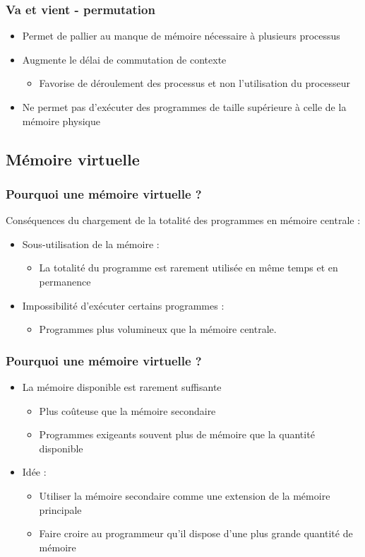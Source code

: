 \begin{frame}
\frametitle{Va et vient - permutation}
\begin{itemize}
\item Permet de pallier au manque de mémoire nécessaire à plusieurs processus
\item Augmente le délai de commutation de contexte
\begin{itemize}
\item Favorise de déroulement des processus et non l'utilisation du processeur
\end{itemize}
\item Ne permet pas d'exécuter des programmes de taille supérieure à celle de la mémoire physique
\end{itemize}
\end{frame}



\subsection{Mémoire virtuelle}
\begin{frame}
\frametitle{Pourquoi une mémoire virtuelle ?}
Conséquences du chargement de la totalité des programmes en mémoire centrale :
\begin{itemize}
\item Sous-utilisation de la mémoire :
\begin{itemize}
\item La totalité du programme est rarement utilisée en même temps et en permanence
\end{itemize}
\item Impossibilité d'exécuter certains programmes :
\begin{itemize}
\item Programmes plus volumineux que la mémoire centrale.
\end{itemize}
\end{itemize}
\end{frame}


\begin{frame}
\frametitle{Pourquoi une mémoire virtuelle ?}
\begin{itemize}
\item La mémoire disponible est rarement suffisante
\begin{itemize}
\item Plus coûteuse que la mémoire secondaire
\item Programmes exigeants souvent plus de mémoire que la quantité disponible
\end{itemize}
\item Idée :
\begin{itemize}
\item Utiliser la mémoire secondaire comme une extension de la mémoire principale
\item Faire croire au programmeur qu'il dispose d'une plus grande quantité de mémoire
\end{itemize}
\end{itemize}
\end{frame}


